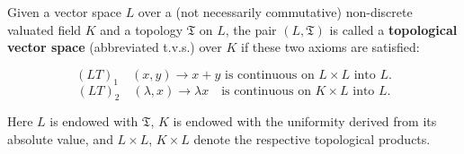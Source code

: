 Given a vector space $L$ over a (not necessarily commutative) non-discrete valuated field $K$ and a topology $\mathfrak{T}$ on $L$, the pair $(L, \mathfrak{T})$ is called a \textbf{topological vector space} (abbreviated t.v.s.) over $K$ if these two axioms are satisfied:

$$(LT)_1 \quad (x, y) \rightarrow x + y \text{ is continuous on } L \times L \text{ into } L.$$
$$(LT)_2 \quad (\lambda, x) \rightarrow \lambda x \quad \text{is continuous on } K \times L \text{ into } L.$$

Here $L$ is endowed with $\mathfrak{T}$, $K$ is endowed with the uniformity derived from its absolute value, and $L \times L$, $K \times L$ denote the respective topological products.
